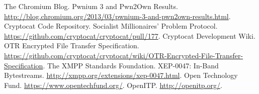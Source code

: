 \documentclass[letterpaper,twocolumn,10pt]{article}
\begin{document}
\begin{thebibliography}{1}
 The Chromium Blog. Pwnium 3 and Pwn2Own Results. \url{http://blog.chromium.org/2013/03/pwnium-3-and-pwn2own-results.html}.
 Cryptocat Code Repository. Socialist Millionaires' Problem Protocol. \url{https://github.com/cryptocat/cryptocat/pull/177}.
 Cryptocat Development Wiki. OTR Encrypted File Transfer Specification. \url{https://github.com/cryptocat/cryptocat/wiki/OTR-Encrypted-File-Transfer-Specification}.
 The XMPP Standards Foundation. XEP-0047: In-Band Bytestreams. \url{http://xmpp.org/extensions/xep-0047.html}.
 Open Technology Fund. \url{https://www.opentechfund.org/}.
 OpenITP. \url{http://openitp.org/}.

\end{thebibliography}
\end{document}
